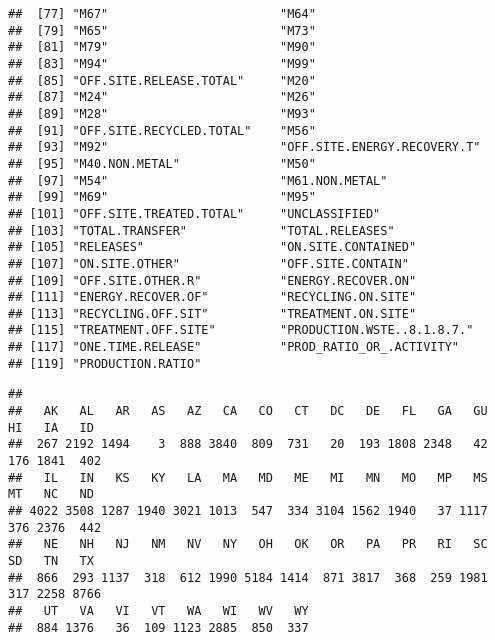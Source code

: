 \documentclass[
]{article}
\newenvironment{Shaded}{\begin{snugshade}}{\end{snugshade}}
\newcommand{\CommentTok}[1]{\textcolor[rgb]{0.56,0.35,0.01}{\textit{#1}}}
\newcommand{\FunctionTok}[1]{\textcolor[rgb]{0.13,0.29,0.53}{\textbf{#1}}}
\newcommand{\NormalTok}[1]{#1}
\newcommand{\OtherTok}[1]{\textcolor[rgb]{0.56,0.35,0.01}{#1}}
\newcommand{\SpecialCharTok}[1]{\textcolor[rgb]{0.81,0.36,0.00}{\textbf{#1}}}
\begin{document}
\begin{verbatim}
##  [77] "M67"                        "M64"                       
##  [79] "M65"                        "M73"                       
##  [81] "M79"                        "M90"                       
##  [83] "M94"                        "M99"                       
##  [85] "OFF.SITE.RELEASE.TOTAL"     "M20"                       
##  [87] "M24"                        "M26"                       
##  [89] "M28"                        "M93"                       
##  [91] "OFF.SITE.RECYCLED.TOTAL"    "M56"                       
##  [93] "M92"                        "OFF.SITE.ENERGY.RECOVERY.T"
##  [95] "M40.NON.METAL"              "M50"                       
##  [97] "M54"                        "M61.NON.METAL"             
##  [99] "M69"                        "M95"                       
## [101] "OFF.SITE.TREATED.TOTAL"     "UNCLASSIFIED"              
## [103] "TOTAL.TRANSFER"             "TOTAL.RELEASES"            
## [105] "RELEASES"                   "ON.SITE.CONTAINED"         
## [107] "ON.SITE.OTHER"              "OFF.SITE.CONTAIN"          
## [109] "OFF.SITE.OTHER.R"           "ENERGY.RECOVER.ON"         
## [111] "ENERGY.RECOVER.OF"          "RECYCLING.ON.SITE"         
## [113] "RECYCLING.OFF.SIT"          "TREATMENT.ON.SITE"         
## [115] "TREATMENT.OFF.SITE"         "PRODUCTION.WSTE..8.1.8.7." 
## [117] "ONE.TIME.RELEASE"           "PROD_RATIO_OR_.ACTIVITY"   
## [119] "PRODUCTION.RATIO"
\end{verbatim}

\begin{Shaded}
\end{Shaded}

\begin{verbatim}
## 
##   AK   AL   AR   AS   AZ   CA   CO   CT   DC   DE   FL   GA   GU   HI   IA   ID 
##  267 2192 1494    3  888 3840  809  731   20  193 1808 2348   42  176 1841  402 
##   IL   IN   KS   KY   LA   MA   MD   ME   MI   MN   MO   MP   MS   MT   NC   ND 
## 4022 3508 1287 1940 3021 1013  547  334 3104 1562 1940   37 1117  376 2376  442 
##   NE   NH   NJ   NM   NV   NY   OH   OK   OR   PA   PR   RI   SC   SD   TN   TX 
##  866  293 1137  318  612 1990 5184 1414  871 3817  368  259 1981  317 2258 8766 
##   UT   VA   VI   VT   WA   WI   WV   WY 
##  884 1376   36  109 1123 2885  850  337
\end{verbatim}
\end{document}
